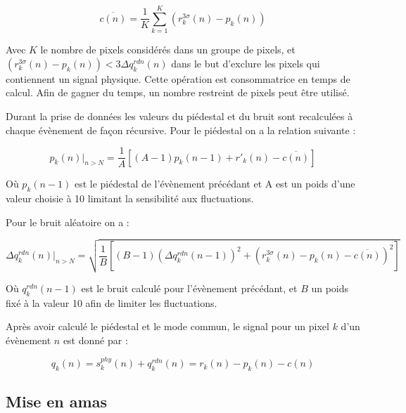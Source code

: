    \begin{equation}
    \overline{c(n)} = \dfrac{1}{K} \sum_{k=1}^K \left( r_k^{3\sigma}(n) - p_k(n) \right)
   \end{equation}

   Avec $K$ le nombre de pixels consid\'er\'es dans un groupe de pixels, et $\left( r_k^{3\sigma}(n) - p_k(n) \right) < 3 \Delta q_k^{rdn}(n)$ dans le but d'exclure les pixels qui contiennent un signal physique. Cette op\'eration est consommatrice en temps de calcul. Afin de gagner du temps, un nombre restreint de pixels peut \^etre utilis\'e.
   
   \medskip 
   
   Durant la prise de donn\'ees les valeurs du pi\'edestal et du bruit sont recalcul\'ees \`a chaque \'ev\`enement de façon r\'ecursive. Pour le piédestal on a la relation suivante : 
   
   \begin{equation}
     p_k(n)|_{n>N} = \dfrac{1}{A} \left[ (A-1)p_k(n-1) + r'_k(n) - \overline{c(n)} \right]
   \end{equation}
   
   O\`u $p_k(n-1)$ est le pi\'edestal de l'\'ev\`enement pr\'ec\'edant et A est un poids d'une valeur choisie \`a 10 limitant la sensibilit\'e aux fluctuations.
   
   \medskip
   
   Pour le bruit al\'eatoire on a : 
   
   \begin{equation}
     \Delta q_k^{rdn}(n)|_{n>N} = \sqrt{ \dfrac{1}{B} \left[ (B-1) \left( \Delta q_k^{rdn}(n-1) \right)^2 + \left( r_k^{3\sigma}(n) - p_k(n) - \overline{c(n)} \right)^2 \right]  }
   \end{equation}
   
   O\`u $q_k^{rdn}(n-1)$ est le bruit calcul\'e pour l'\'ev\`enement pr\'ec\'edant, et $B$ un poids fix\'e \`a la valeur 10 afin de limiter les fluctuations.
   
   Apr\`es avoir calcul\'e le piédestal et le  mode commun, le signal pour un pixel $k$ d'un \'ev\`enement $n$ est donn\'e par :
   
   \begin{equation}
     q_k(n) = s_k^{phy}(n) + q_k^{rdn}(n) = r_k(n) - p_k(n) - c(n)
   \end{equation}

  \subsection{Mise en amas}
   
